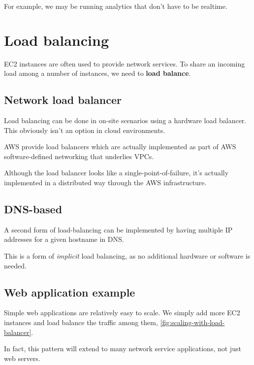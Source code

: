\documentclass[slides]{pgnotes}
\begin{document}
For example, we may be running analytics that don't have to be realtime.



\section{Load balancing}

EC2 instances are often used to provide network services.
To share an incoming load among a number of instances, we need to \textbf{load balance}.

\subsection{Network load balancer}

Load balancing can be done in on-site scenarios using a hardware load balancer.
This obviously isn't an option in cloud environments.

AWS provide load balancers which are actually implemented as part of AWS software-defined networking that underlies VPCs.

Although the load balancer looks like a single-point-of-failure, it's actually implemented in a distributed way through the AWS infrastructure.

\subsection{DNS-based}

A second form of load-balancing can be implemented by having multiple IP addresses for a given hostname in DNS.

This is a form of \textit{implicit} load balancing, as no additional hardware or software is needed.

\subsection{Web application example}

Simple web applications are relatively easy to scale.
We simply add more EC2 instances and load balance the traffic among them, \autoref{fig:scaling-with-load-balancer}.

In fact, this pattern will extend to many network service applications, not just web servers.

\end{document}
